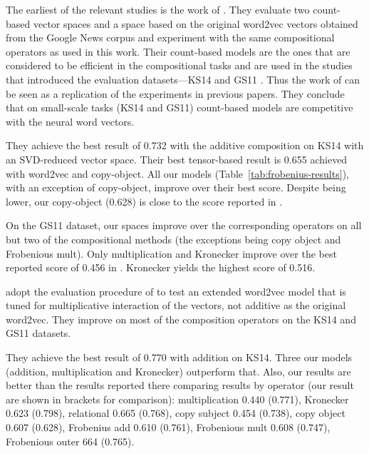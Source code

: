 The earliest of the relevant studies is the work of . They evaluate two count-based vector spaces and a space based on the original word2vec vectors obtained from the Google News corpus \cite{mikolov2013distributed} and experiment with the same compositional operators as used in this work. Their count-based models are the ones that are considered to be efficient in the compositional tasks and are used in the studies that introduced the evaluation datasets---KS14 \cite{kartsadrqpl2014} and GS11 \cite{Grefenstette:2011:ESC:2145432.2145580}. Thus the work of  can be seen as a replication of the experiments in previous papers. They conclude that on small-scale tasks (KS14 and GS11) count-based models are competitive with the neural word vectors.

They achieve the best result of 0.732 with the additive composition on KS14 with an SVD-reduced vector space. Their best tensor-based result is 0.655 achieved with word2vec and copy-object. All our models (Table~\ref{tab:frobenius-results}), with an exception of copy-object, improve over their best score. Despite being lower, our copy-object (0.628) is close to the score reported in \cite{milajevs-EtAl:2014:EMNLP2014}.

On the GS11 dataset, our spaces improve over the corresponding operators on all but two of the compositional methods (the exceptions being copy object and Frobenious mult). Only multiplication and Kronecker improve over the best reported score of 0.456 in . Kronecker yields the highest score of 0.516.

 adopt the evaluation procedure of  to test an extended word2vec model that is tuned for multiplicative interaction of the vectors, not additive as the original word2vec. They improve on most of the composition operators on the KS14 and GS11 datasets.

They achieve the best result of 0.770 with addition on KS14. Three our models (addition, multiplication and Kronecker) outperform that. Also, our results are better than the results reported there comparing results by operator (our result are shown in brackets for comparison): multiplication 0.440 (0.771), Kronecker 0.623 (0.798), relational 0.665 (0.768), copy subject 0.454 (0.738), copy object 0.607 (0.628), Frobenius add 0.610 (0.761), Frobenious mult 0.608 (0.747), Frobenious outer 664 (0.765).

